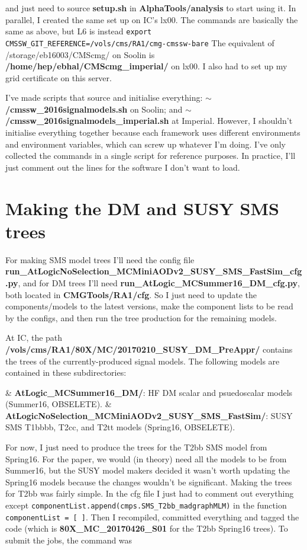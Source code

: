 and just need to source \textbf{setup.sh} in \textbf{AlphaTools/analysis} to start using it. In parallel, I created the same set up on IC's lx00. The commands are basically the same as above, but L6 is instead \texttt{export CMSSW\_GIT\_REFERENCE=/vols/cms/RA1/cmg-cmssw-bare} The equivalent of /storage/eb16003/CMScmg/ on Soolin is \textbf{/home/hep/ebhal/CMScmg\_imperial/} on lx00. I also had to set up my grid certificate on this server.

I've made scripts that source and initialise everything: \textbf{$\sim$/cmssw\_2016signalmodels.sh} on Soolin; and \textbf{$\sim$/cmssw\_2016signalmodels\_imperial.sh} at Imperial. However, I shouldn't initialise everything together because each framework uses different environments and environment variables, which can screw up whatever I'm doing. I've only collected the commands in a single script for reference purposes. In practice, I'll just comment out the lines for the software I don't want to load.


\section{Making the DM and SUSY SMS trees}

For making SMS model trees I'll need the config file \textbf{run\_AtLogicNoSelection\_MCMiniAODv2\_SUSY\_SMS\_FastSim\_cfg.py}, and for DM trees I'll need \textbf{run\_AtLogic\_MCSummer16\_DM\_cfg.py}, both located in \textbf{CMGTools/RA1/cfg}. So I just need to update the components/models to the latest versions, make the component lists to be read by the configs, and then run the tree production for the remaining models.

At IC, the path \textbf{/vols/cms/RA1/80X/MC/20170210\_SUSY\_DM\_PreAppr/} contains the trees of the currently-produced signal models. The following models are contained in these subdirectories:

\begin{easylist}
\easylistprops
& \textbf{AtLogic\_MCSummer16\_DM/}: HF DM scalar and psuedoscalar models (Summer16, OBSELETE).
& \textbf{AtLogicNoSelection\_MCMiniAODv2\_SUSY\_SMS\_FastSim/}: SUSY SMS T1bbbb, T2cc, and T2tt models (Spring16, OBSELETE).
\end{easylist}

For now, I just need to produce the trees for the T2bb SMS model from Spring16. For the paper, we would (in theory) need all the models to be from Summer16, but the SUSY model makers decided it wasn't worth updating the Spring16 models because the changes wouldn't be significant. Making the trees for T2bb was fairly simple. In the cfg file I just had to comment out everything except \verb!componentList.append(cmps.SMS_T2bb_madgraphMLM)! in the function \texttt{componentList = [ ]}. Then I recompiled, committed everything and tagged the code (which is \textbf{80X\_MC\_20170426\_S01} for the T2bb Spring16 trees). To submit the jobs, the command was

